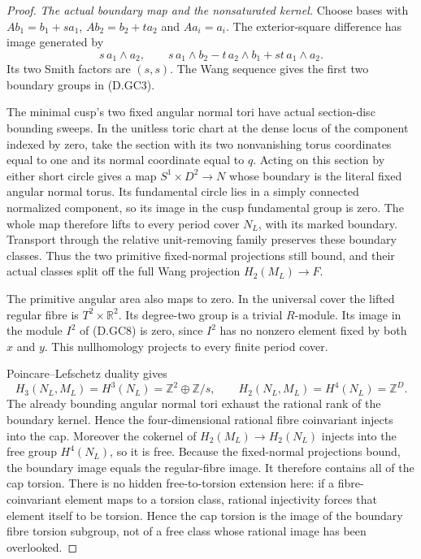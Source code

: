 \begin{proof}
\emph{The actual boundary map and the nonsaturated kernel.}
Choose bases with
$A b_1=b_1+s a_1$, $A b_2=b_2+t a_2$ and
$A a_i=a_i$. The exterior-square difference has
image generated by
\[
 s\,a_1\wedge a_2,\qquad
 s\,a_1\wedge b_2-t\,a_2\wedge b_1
                         +st\,a_1\wedge a_2 .
                                                        \tag{D.GC13}
\]
Its two Smith factors are $(s,s)$.
The Wang sequence gives the first two boundary
groups in (D.GC3).

The minimal cusp's two fixed angular normal
tori have actual section-disc bounding sweeps.
In the unitless toric chart at the dense locus
of the component indexed by zero, take the
section with its two nonvanishing torus
coordinates equal to one and its normal
coordinate equal to $q$. Acting on this
section by either short circle gives a map
$S^1\times D^2\to N$ whose boundary is the
literal fixed angular normal torus. Its
fundamental circle lies in a simply connected
normalized component, so its image in the
cusp fundamental group is zero. The whole
map therefore lifts to every period cover
$N_L$, with its marked boundary. Transport
through the relative unit-removing family
preserves these boundary classes. Thus the
two primitive fixed-normal projections still
bound, and their actual classes split off
the full Wang projection $H_2(M_L)\to F$.

The primitive angular area also maps to zero.
In the universal cover the lifted regular
fibre is $T^2\times\mathbb R^2$. Its degree-two
group is a trivial $R$-module. Its image in
the module $I^2$ of (D.GC8) is zero, since
$I^2$ has no nonzero element fixed by both
$x$ and $y$. This nullhomology projects to
every finite period cover.

Poincare--Lefschetz duality gives
\[
 H_3(N_L,M_L)=H^3(N_L)=\mathbb Z^2\oplus\mathbb Z/s,
 \qquad H_2(N_L,M_L)=H^4(N_L)=\mathbb Z^D .
                                                        \tag{D.GC14}
\]
The already bounding angular normal tori exhaust
the rational rank of the boundary kernel.
Hence the four-dimensional rational fibre
coinvariant injects into the cap.
Moreover the cokernel of
$H_2(M_L)\to H_2(N_L)$ injects into the free
group $H^4(N_L)$, so it is free.
Because the fixed-normal projections bound,
the boundary image equals the regular-fibre image.
It therefore contains all of the cap torsion.
There is no hidden free-to-torsion extension
here: if a fibre-coinvariant element maps to
a torsion class, rational injectivity forces
that element itself to be torsion. Hence
the cap torsion is the image of the boundary
fibre torsion subgroup, not of a free class
whose rational image has been overlooked.


\end{proof}

